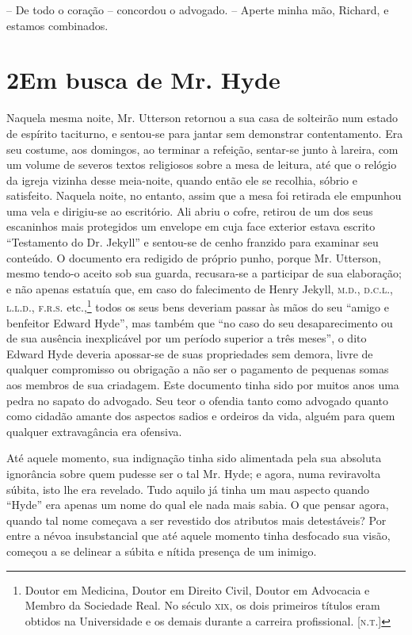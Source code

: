-- De todo o coração -- concordou o advogado. -- Aperte minha mão,
Richard, e estamos combinados. 


\chapter[2 -- Em busca de Mr. Hyde]{2\break Em busca de Mr. Hyde}

Naquela mesma noite, Mr. Utterson retornou a sua casa de solteirão num
estado de espírito taciturno, e sentou-se para jantar sem demonstrar
contentamento.  Era seu costume, aos domingos, ao terminar a refeição,
sentar-se junto à lareira, com um volume de severos textos religiosos
sobre a mesa de leitura, até que o relógio da igreja vizinha desse
meia-noite, quando então ele se recolhia, sóbrio e satisfeito.  Naquela
noite, no entanto, assim que a mesa foi retirada ele empunhou uma vela
e dirigiu-se ao escritório.  Ali abriu o cofre, retirou de um dos seus
escaninhos mais protegidos um envelope em cuja face exterior estava
escrito “Testamento do Dr. Jekyll” e sentou-se de cenho franzido para
examinar seu conteúdo.  O documento era redigido de próprio punho,
porque Mr. Utterson, mesmo tendo-o aceito sob sua guarda, recusara-se a
participar de sua elaboração; e não apenas estatuía que, em caso do
falecimento de Henry Jekyll, \textsc{m.d.}, \textsc{d.c.l.}, \textsc{l.l.d.}, \textsc{f.r.s.} etc.,\footnote{
Doutor em Medicina, Doutor em Direito Civil, Doutor em Advocacia e
Membro da Sociedade Real.  No século \textsc{xix}, os dois primeiros títulos eram
obtidos na Universidade e os demais durante a carreira profissional. [\textsc{n.t.}]}
todos os seus bens deveriam passar às mãos do seu
“amigo e benfeitor Edward Hyde”, mas também que “no caso do seu
desaparecimento ou de sua ausência inexplicável por um período superior
a três meses”, o dito Edward Hyde deveria apossar-se de suas
propriedades sem demora, livre de qualquer compromisso ou obrigação a
não ser o pagamento de pequenas somas aos membros de sua criadagem. 
Este documento tinha sido por muitos anos uma pedra no sapato do
advogado.  Seu teor o ofendia tanto como advogado quanto como cidadão
amante dos aspectos sadios e ordeiros da vida, alguém para quem
qualquer extravagância era ofensiva.

Até aquele momento, sua indignação tinha sido alimentada pela sua
absoluta ignorância sobre quem pudesse ser o tal Mr. Hyde; e agora,
numa reviravolta súbita, isto lhe era revelado.  Tudo aquilo já tinha
um mau aspecto quando “Hyde” era apenas um nome do qual ele nada mais
sabia.  O que pensar agora, quando tal nome começava a ser revestido
dos atributos mais detestáveis?  Por entre a névoa insubstancial que
até aquele momento tinha desfocado sua visão, começou a se delinear a
súbita e nítida presença de um inimigo. 

